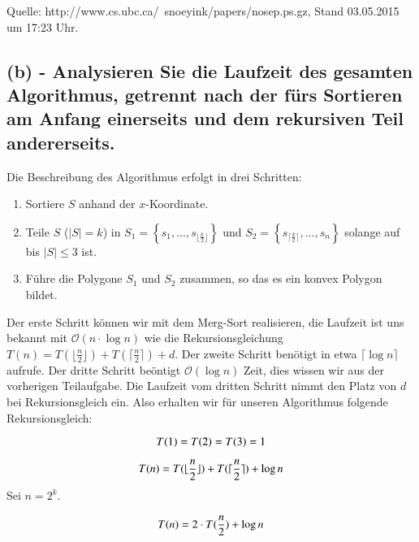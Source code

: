 \documentclass[a4paper]{article}
\begin{document}
Quelle: http://www.cs.ubc.ca/~snoeyink/papers/nosep.ps.gz, Stand 03.05.2015 um 17:23 Uhr. 

\subsection*{(b) - Analysieren Sie die Laufzeit des gesamten Algorithmus, getrennt nach der fürs Sortieren am Anfang einerseits und dem rekursiven Teil andererseits. }

Die Beschreibung des Algorithmus erfolgt in drei Schritten:

\begin{enumerate}

\item Sortiere $S$ anhand der $x$-Koordinate.

\item Teile $S$ ($|S| = k$) in $S_1 = \left\{s_1, ..., s_{\lfloor \frac{k}{2} \rfloor } \right\}$ und $S_2 = \left\{s_{ \lceil \frac{k}{2} \rceil}, ..., s_n \right\}$ solange auf bis $|S| \leq 3$ ist.

\item Führe die Polygone $S_1$ und $S_2$ zusammen, so das es ein konvex Polygon bildet.

\end{enumerate}

Der erste Schritt können wir mit dem Merg-Sort realisieren, die Laufzeit ist uns bekannt mit $\mathcal{O}(n \cdot \log n)$ wie die Rekursionsgleichung $T(n) = T(\lfloor \frac{n}{2} \rfloor) + T(\lceil \frac{n}{2} \rceil) + d$.
Der zweite Schritt benötigt in etwa $\lceil \log n \rceil$ aufrufe. Der dritte Schritt beöntigt $\mathcal{O}(\log n)$ Zeit, dies wissen wir aus der vorherigen Teilaufgabe. Die Laufzeit vom dritten Schritt nimmt den Platz von $d$ bei Rekursionsgleich ein. Also erhalten wir für unseren Algorithmus folgende Rekursionsgleich:

\begin{equation}
	T(1) = T(2) = T(3) = 1 	\linebreak
\end{equation}

\begin{equation}
	T(n) = T(\lfloor \frac{n}{2} \rfloor) + T(\lceil \frac{n}{2} \rceil) + \log n \linebreak
\end{equation}
Sei $n=2^k$.

\begin{equation}
T(n) = 2 \cdot T(\frac{n}{2}) + \log n \linebreak
\end{equation}
\end{document}
